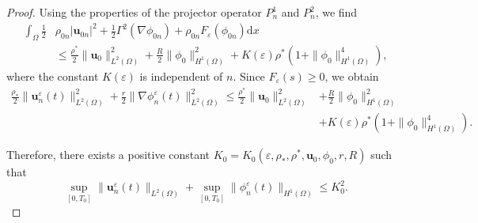 \documentclass[10pt,a4paper]{amsart}
\def\Ga{\Gamma}
\def\bfu{\mathbf{u}}
\begin{document}
\begin{proof}
Using the properties of the projector operator $P_n^1$ and $P_n^2$, we find
$$
\begin{aligned}
\int_{\Omega} \frac{1}{2} &\rho_{0 n}\left|\bfu_{0 n}\right|^2  +\frac{1}{2}\Ga^2\left(\nabla \phi_{0 n}\right)+\rho_{0 n} F_{\varepsilon}\left(\phi_{0 n}\right) \mathrm{d} x \\& \leq \frac{\rho^*}{2}\|\bfu_0\|_{L^2(\Omega)}^2+\frac{R}{2}\|\phi_0\|_{H^1(\Omega)}^2+K({\varepsilon}) \rho^*\left(1+\|\phi_0\|_{H^1(\Omega)}^4\right),
\end{aligned}
$$
where the constant $K({\varepsilon}) $ is independent of $n$. Since $F_{\varepsilon}(s) \geq 0$, we obtain
$$
\begin{aligned}
\frac{\rho_*}{2}\|\bfu_n^{\varepsilon}(t)\|_{L^2(\Omega)}^2 +\frac{r}{2}\|\nabla \phi_n^{\varepsilon}(t)\|_{L^2(\Omega)}^2 \leq \frac{\rho^*}{2}\|\bfu_0\|_{L^2(\Omega)}^2&+\frac{R}{2}\|\phi_0\|_{H^1(\Omega)}^2\\
&+K({\varepsilon}) \rho^*\left(1+\|\phi_0\|_{H^1(\Omega)}^4\right).
\end{aligned}
$$

Therefore, there exists a positive constant $K_0=K_0\left({\varepsilon},\rho_*, \rho^*, \bfu_0, \phi_0,r,R\right)$ such that
$$
\sup _{[0 ,T_0]}\|\bfu_n^{\varepsilon}(t)\|_{L^2(\Omega)}+\sup_{[0 ,T_0]}\|\phi_n^{\varepsilon}(t)\|_{H^1(\Omega)} \leq K_0^2.
$$
\end{proof}
\end{document}
